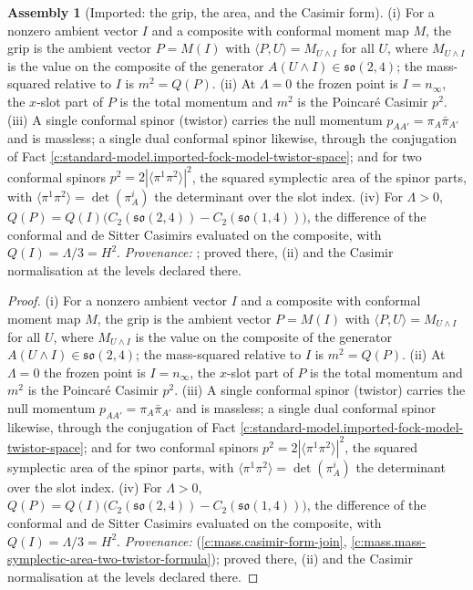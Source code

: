 \documentclass[11pt]{article}
\theoremstyle{definition}
\newtheorem{assembled}[theorem]{Assembly}
\theoremstyle{plain}
\newcommand{\changedmark}[2]{\marginpar{\raggedright\scriptsize\color{#1}#2}}
\providecommand{\so}{}\renewcommand{\so}{\mathfrak{so}}
\providecommand{\br}{}\renewcommand{\br}[1]{\langle #1\rangle}
\providecommand{\ip}{}\renewcommand{\ip}[2]{\langle #1, #2\rangle}
\begin{document}
\begin{assembled}[Imported: the grip, the area, and the Casimir form]\label{c:standard-model.imported-grip-area-casimir-form}
\changedmark{gray}{reworded}
(i) For a nonzero ambient vector $I$ and a composite with conformal moment map $M$, the grip is the ambient vector $P = M(I)$ with $\ip{P}{U} = M_{U \wedge I}$ for all $U$, where $M_{U \wedge I}$ is the value on the composite of the generator $A(U \wedge I) \in \so(2,4)$; the mass-squared relative to $I$ is $m^{2} = Q(P)$. (ii) At $\Lambda = 0$ the frozen point is $I = n_{\infty}$, the $x$-slot part of $P$ is the total momentum and $m^{2}$ is the Poincar\'e Casimir $p^{2}$. (iii) A single conformal spinor (twistor) carries the null momentum $p_{AA'} = \pi_{A}\bar\pi_{A'}$ and is massless; a single dual conformal spinor likewise, through the conjugation of Fact \ref{c:standard-model.imported-fock-model-twistor-space}; and for two conformal spinors $p^{2} = 2|\br{\pi^{1}\pi^{2}}|^{2}$, the squared symplectic area of the spinor parts, with $\br{\pi^{1}\pi^{2}} = \det(\pi^{i}_{A})$ the determinant over the slot index. (iv) For $\Lambda > 0$, $Q(P) = Q(I)\bigl(C_{2}(\so(2,4)) - C_{2}(\so(1,4))\bigr)$, the difference of the conformal and de Sitter Casimirs evaluated on the composite, with $Q(I) = \Lambda/3 = H^{2}$. \emph{Provenance:} \cite[Def.~5.4, Prop.~4.1, Prop.~5.7]{ButlerT11}; proved there, (ii) and the Casimir normalisation at the levels declared there.
\end{assembled}
\begin{proof}
(i) For a nonzero ambient vector $I$ and a composite with conformal moment map $M$, the grip is the ambient vector $P = M(I)$ with $\ip{P}{U} = M_{U \wedge I}$ for all $U$, where $M_{U \wedge I}$ is the value on the composite of the generator $A(U \wedge I) \in \so(2,4)$; the mass-squared relative to $I$ is $m^{2} = Q(P)$. (ii) At $\Lambda = 0$ the frozen point is $I = n_{\infty}$, the $x$-slot part of $P$ is the total momentum and $m^{2}$ is the Poincar\'e Casimir $p^{2}$. (iii) A single conformal spinor (twistor) carries the null momentum $p_{AA'} = \pi_{A}\bar\pi_{A'}$ and is massless; a single dual conformal spinor likewise, through the conjugation of Fact \ref{c:standard-model.imported-fock-model-twistor-space}; and for two conformal spinors $p^{2} = 2|\br{\pi^{1}\pi^{2}}|^{2}$, the squared symplectic area of the spinor parts, with $\br{\pi^{1}\pi^{2}} = \det(\pi^{i}_{A})$ the determinant over the slot index. (iv) For $\Lambda > 0$, $Q(P) = Q(I)\bigl(C_{2}(\so(2,4)) - C_{2}(\so(1,4))\bigr)$, the difference of the conformal and de Sitter Casimirs evaluated on the composite, with $Q(I) = \Lambda/3 = H^{2}$. \emph{Provenance:} \cite[Def.~5.4, Prop.~4.1, Prop.~5.7]{ButlerT11} (\ref{c:mass.casimir-form-join}, \ref{c:mass.mass-symplectic-area-two-twistor-formula}); proved there, (ii) and the Casimir normalisation at the levels declared there.

\end{proof}
\end{document}
